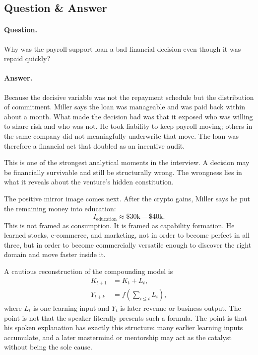 \subsection{Question \& Answer}

\paragraph{Question.} Why was the payroll-support loan a bad financial decision even though it was repaid quickly?

\paragraph{Answer.} Because the decisive variable was not the repayment schedule but the distribution of commitment. Miller says the loan was manageable and was paid back within about a month. What made the decision bad was that it exposed who was willing to share risk and who was not. He took liability to keep payroll moving; others in the same company did not meaningfully underwrite that move. The loan was therefore a financial act that doubled as an incentive audit.

This is one of the strongest analytical moments in the interview. A decision may be financially survivable and still be structurally wrong. The wrongness lies in what it reveals about the venture's hidden constitution.

The positive mirror image comes next. After the crypto gains, Miller says he put the remaining money into education:
\begin{equation}
I_{\text{education}} \approx \$30\text{k}-\$40\text{k}.
\end{equation}
This is not framed as consumption. It is framed as capability formation. He learned stocks, e-commerce, and marketing, not in order to become perfect in all three, but in order to become commercially versatile enough to discover the right domain and move faster inside it.

A cautious reconstruction of the compounding model is
\begin{align}
K_{t+1}&=K_t+L_t,\\
Y_{t+k}&=f\!\left(\sum_{i\le t} L_i\right),
\end{align}
where \(L_t\) is one learning input and \(Y_t\) is later revenue or business output. The point is not that the speaker literally presents such a formula. The point is that his spoken explanation has exactly this structure: many earlier learning inputs accumulate, and a later mastermind or mentorship may act as the catalyst without being the sole cause.

